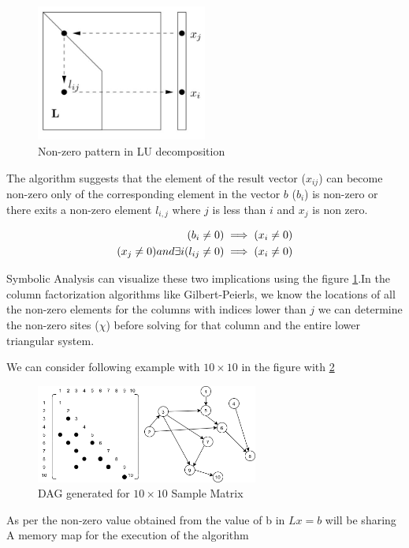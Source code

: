 \begin{figure}[H]
    \centering
    \includegraphics[width = 0.50\textwidth]{./Theory/nnzPattern.JPG}
    \caption{Non-zero pattern in LU decomposition}
    \label{fig:GP:nnzPattern}
\end{figure}

The algorithm suggests that the element of the result vector ($x_{ij}$) can become non-zero only of the corresponding element in the vector $b$ ($b_{i}$) is non-zero or there exits a non-zero element $l_{i,j}$ where $j$ is less than $i$ and $x_{j}$ is non zero. 

\begin{subequations}
    \centering
    \begin{align}
        (b_i \neq 0) &\implies (x_i \neq 0) \\
        (x_j \neq 0) and \exists i(l_{ij} \neq 0) &\implies (x_i \neq 0)
    \end{align}
    \label{eqn:GP:findingX}
\end{subequations}

Symbolic Analysis can visualize these two implications using the figure \ref{fig:GP:nnzPattern}.In the column factorization algorithms like Gilbert-Peierls, we know the locations of all the non-zero elements for the columns with indices lower than $j$ we can determine the non-zero sites ($\chi$) before solving for that column and the entire lower triangular system.


We can consider following example with $10\times10$ in the figure with \ref{fig:SPLsolve0}
\begin{figure}[H]
    \centering
    \includegraphics[width = 0.65\textwidth]{./Theory/PpT-SPLsolve0.png}
    \caption{DAG generated for $10\times10$ Sample Matrix}
    \label{fig:SPLsolve0}
\end{figure}

As per the non-zero value obtained from the value of b in $Lx=b$ will be sharing A memory map for the execution of the algorithm \cite{davis2006direct}

